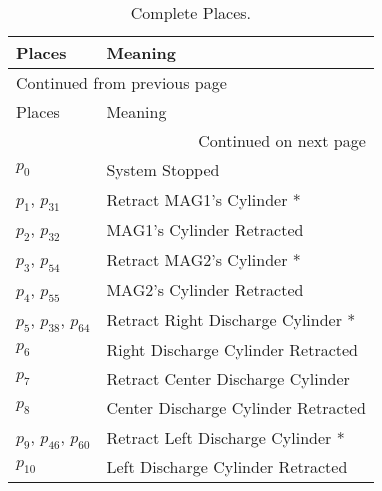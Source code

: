 \begin{longtable}{m{5cm}m{5cm}}
\caption{Complete Places.}
\\
Places & Meaning\\
\hline
\endfirsthead
\multicolumn{2}{l}{Continued from previous page} \\
\hline

Places & Meaning \\

\hline
\endhead
\hline\multicolumn{2}{r}{Continued on next page} \\
\endfoot
\endlastfoot
\hline
\hyperlink{completeNet:p0}{\hypertarget{completeTable:p0m1}{$p_{0}$}} & System Stopped\\
\hyperlink{completeNet:p1}{\hypertarget{completeTable:p1}{$p_{1}$}}, \hyperlink{completeNet:p31}{\hypertarget{completeTable:p31}{$p_{31}$}} & Retract MAG1's Cylinder *\\
\hyperlink{completeNet:p2}{\hypertarget{completeTable:p2}{$p_{2}$}}, \hyperlink{completeNet:p32}{\hypertarget{completeTable:p32}{$p_{32}$}} & MAG1's Cylinder Retracted\\
\hyperlink{completeNet:p3}{\hypertarget{completeTable:p3}{$p_{3}$}}, \hyperlink{completeNet:p54}{\hypertarget{completeTable:p54}{$p_{54}$}} & Retract MAG2's Cylinder *\\
\hyperlink{completeNet:p4}{\hypertarget{completeTable:p4}{$p_{4}$}}, \hyperlink{completeNet:p55}{\hypertarget{completeTable:p55}{$p_{55}$}} & MAG2's Cylinder Retracted\\
\hyperlink{completeNet:p5}{\hypertarget{completeTable:p5}{$p_{5}$}}, \hyperlink{completeNet:p38}{\hypertarget{completeTable:p38}{$p_{38}$}}, \hyperlink{completeNet:p64}{\hypertarget{completeTable:p64}{$p_{64}$}} & Retract Right Discharge Cylinder *\\
\hyperlink{completeNet:p6}{\hypertarget{completeTable:p6}{$p_{6}$}} & Right Discharge Cylinder Retracted\\
\hyperlink{completeNet:p7}{\hypertarget{completeTable:p7}{$p_{7}$}} & Retract Center Discharge Cylinder\\
\hyperlink{completeNet:p8}{\hypertarget{completeTable:p8}{$p_{8}$}} & Center Discharge Cylinder Retracted\\
\hyperlink{completeNet:p9}{\hypertarget{completeTable:p9}{$p_{9}$}}, \hyperlink{completeNet:p46}{\hypertarget{completeTable:p46}{$p_{46}$}}, \hyperlink{completeNet:p60}{\hypertarget{completeTable:p60}{$p_{60}$}} & Retract Left Discharge Cylinder *\\
\hyperlink{completeNet:p10}{\hypertarget{completeTable:p10}{$p_{10}$}} & Left Discharge Cylinder Retracted\\

\end{longtable}
